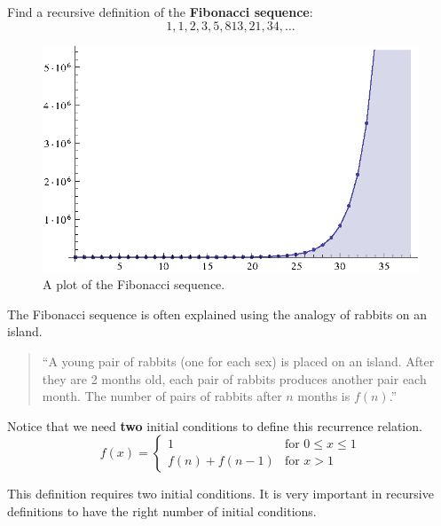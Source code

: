 \begin{ex}
  Find a recursive definition of the \textbf{Fibonacci sequence}:
  \[ 1, 1, 2, 3, 5, 8 13, 21, 34, \ldots \]
  \begin{figure}[h]
    \begin{center}
      \includegraphics{discrete/recursion/fibonacci.eps}
    \end{center}
    \caption{A plot of the Fibonacci sequence.}
    \label{fig:fibonacci}
  \end{figure}

  The Fibonacci sequence is often explained using the analogy of rabbits on an
  island.
  \begin{quote}
    ``A young pair of rabbits (one for each sex) is placed on an island. After
    they are 2 months old, each pair of rabbits produces another pair each month.
    The number of pairs of rabbits after $n$ months is $f(n)$.''
  \end{quote}
  \begin{sol}
    Notice that we need \textbf{two} initial conditions to define this
    recurrence relation.
    \begin{equation}
      f(x) =
      \begin{cases}
        1 & \text{for }0 \leq x \leq 1 \\
        f(n) + f(n-1) &\text{for } x > 1
      \end{cases}
    \end{equation}
  \end{sol}
  \begin{note}
    This definition requires two initial conditions. It is very important in recursive definitions to have the right number of initial conditions.
  \end{note}
\end{ex}
